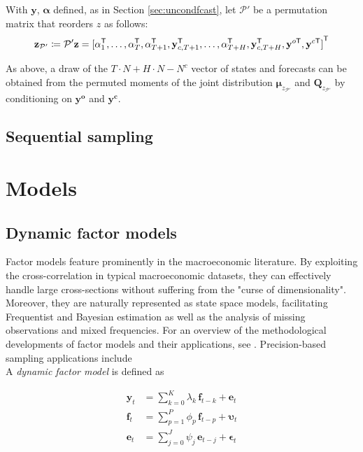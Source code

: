 \documentclass[notitlepage,a4paper,12pt]{article}
\newcommand{\transpose}[1]{{#1}^{\sf{T}}}
\begin{document}
With $\mathbf{y}$, $\boldsymbol{\alpha}$ defined, as in Section \ref{sec:uncondfcast}, let $\mathcal{P}'$ be a permutation matrix that reorders $z$ as follows:
$$
\mathbf{z}_{\mathcal{P}'} \coloneqq \mathcal{P}' \mathbf{z} =
 \transpose{[
     \alpha^{\sf{T}}_1, 
     \dots, 
     \alpha^{\sf{T}}_T, 
     \alpha^{\sf{T}}_{T+1}, 
     \mathbf{y}^{\sf{T}}_{c,T+1}, 
     \dots, 
     \alpha^{\sf{T}}_{T+H}, 
     \mathbf{y}^{\sf{T}}_{c,T+H},
     \mathbf{y}^{o\sf{T}},
     \mathbf{y}^{c\sf{T}}]}
$$

As above, a draw of the $T\!\cdot\!N + H\!\cdot\!N - N^c$ vector of states and forecasts can be obtained from the permuted moments of the joint distribution $\boldsymbol{\mu}_{z_{\mathcal{P}'}} $ and $\mathbf{Q}_{z_{\mathcal{P}'}} $ by conditioning on $\mathbf{y^{o}}$ and $\mathbf{y^c}$.

\subsection{Sequential sampling}

\section{Models}\label{sec:models}

\subsection{Dynamic factor models}\label{sec:dfm}

Factor models feature prominently in the macroeconomic literature. By exploiting the cross-correlation in typical macroeconomic datasets, they can effectively handle large cross-sections without suffering from the "curse of dimensionality". Moreover, they are naturally represented as state space models, facilitating Frequentist and Bayesian estimation as well as the analysis of missing observations and mixed frequencies. For an overview of the methodological developments of factor models and their applications, see \citet{stockwatson2016_hbmacro}. Precision-based sampling applications include \citet{chanjeliazkov_2009,mccausland_factor2015,kaufmannschumacher_jae2017,kaufmannschumacher_jectrcs2019}\\

A \textit{dynamic factor model} is defined as

\begin{subequations}
    \label{eqn:factormodel}
    \begin{align}
        \mathbf{y}_t &= \sum_{k=0}^K \lambda_k \, \mathbf{f}_{t-k} + \mathbf{e}_t \\
        \mathbf{f}_t &= \sum_{p=1}^P \phi_p \, \mathbf{f}_{t-p} + \boldsymbol{\upsilon}_t \\
        \mathbf{e}_t &= \sum_{j=0}^J \psi_j \, \mathbf{e}_{t-j} + \boldsymbol{\epsilon}_t 
    \end{align}
\end{subequations}
\end{document}
